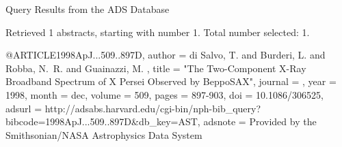 Query Results from the ADS Database


Retrieved 1 abstracts, starting with number 1.  Total number selected: 1.

@ARTICLE{1998ApJ...509..897D,
   author = {{di Salvo}, T. and {Burderi}, L. and {Robba}, N.~R. and {Guainazzi}, M.
	},
    title = "{The Two-Component X-Ray Broadband Spectrum of X Persei Observed by BeppoSAX}",
  journal = {\apj},
     year = 1998,
    month = dec,
   volume = 509,
    pages = {897-903},
      doi = {10.1086/306525},
   adsurl = {http://adsabs.harvard.edu/cgi-bin/nph-bib_query?bibcode=1998ApJ...509..897D&db_key=AST},
  adsnote = {Provided by the Smithsonian/NASA Astrophysics Data System}
}



